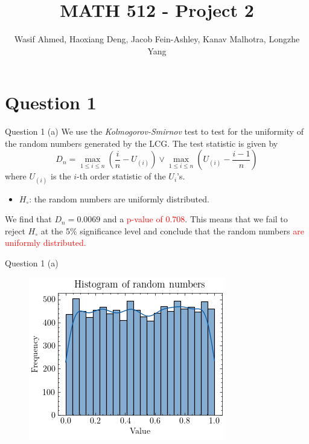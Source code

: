 \documentclass[compress,12pt]{beamer}
\title{MATH 512 - Project 2}
\subtitle{}
\date{}
\author{Wasif Ahmed, Haoxiang Deng, Jacob Fein-Ashley, Kanav Malhotra, Longzhe Yang}
\newcommand{\myRed}[1]{\textcolor{red}{#1}}
\begin{document}
\frame[plain]{\titlepage}

\section{Question 1}

\begin{frame}{Question 1 (a)}
      We use the \emph{Kolmogorov-Smirnov} test to test for the uniformity of the random numbers generated by the LCG. The test statistic is given by
      \begin{equation*}
            D_n = \max_{1 \leq i \leq n} \left( \frac{i}{n} - U_{(i)} \right) \vee \max_{1 \leq i \leq n} \left( U_{(i)} - \frac{i-1}{n} \right)
      \end{equation*}
      where $U_{(i)}$ is the $i$-th order statistic of the $U_i$'s. 
      
      \begin{itemize}
            \item $H_{\circ}$: the random numbers are uniformly distributed. 
      \end{itemize}
      
    \begin{tcolorbox}
      We find that $D_n = 0.0069$ and a \myRed{p-value of $0.708$}. This means that we fail to reject $H_{\circ}$ at the 5\% significance level and conclude that the random numbers \myRed{are uniformly distributed.}
    \end{tcolorbox}
\end{frame}

\begin{frame}{Question 1 (a)}
      \begin{figure}
            \centering
            \includegraphics[scale=0.7]{imgs/1a.png}
      \end{figure}
\end{frame}
\end{document}
